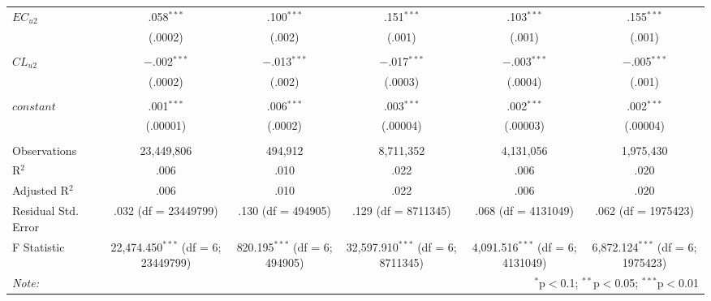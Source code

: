 \begin{sidewaystable}[!htbp]
{\begin{tabular}{@{\extracolsep{0pt}}lccccc}
   $EC_{u2}$ & .058$^{***}$ & .100$^{***}$ & .151$^{***}$ & .103$^{***}$ & .155$^{***}$ \\
    & (.0002) & (.002) & (.001) & (.001) & (.001) \\
    & & & & & \\
   $CL_{u2}$ & $-$.002$^{***}$ & $-$.013$^{***}$ & $-$.017$^{***}$ & $-$.003$^{***}$ & $-$.005$^{***}$ \\
    & (.0002) & (.002) & (.0003) & (.0004) & (.001) \\
    & & & & & \\
   $constant$ & .001$^{***}$ & .006$^{***}$ & .003$^{***}$ & .002$^{***}$ & .002$^{***}$ \\
    & (.00001) & (.0002) & (.00004) & (.00003) & (.00004) \\
    & & & & & \\
   \hline
   Observations & 23,449,806 & 494,912 & 8,711,352 & 4,131,056 & 1,975,430 \\
   R$^{2}$ & .006 & .010 & .022 & .006 & .020 \\
   Adjusted R$^{2}$ & .006 & .010 & .022 & .006 & .020 \\
   Residual Std. Error & .032 (df = 23449799) & .130 (df = 494905) & .129 (df = 8711345) & .068 (df = 4131049) & .062 (df = 1975423) \\
   F Statistic & 22,474.450$^{***}$ (df = 6; 23449799) & 820.195$^{***}$ (df = 6; 494905) & 32,597.910$^{***}$ (df = 6; 8711345) & 4,091.516$^{***}$ (df = 6; 4131049) & 6,872.124$^{***}$ (df = 6; 1975423) \\
   \hline
   \multicolumn{1}{l}{\textit{Note:}}  & \multicolumn{5}{r}{$^{*}$p$<$0.1; $^{**}$p$<$0.05; $^{***}$p$<$0.01} \\
  \end{tabular}}
\end{sidewaystable}
\renewcommand{\arraystretch}{1.5}

